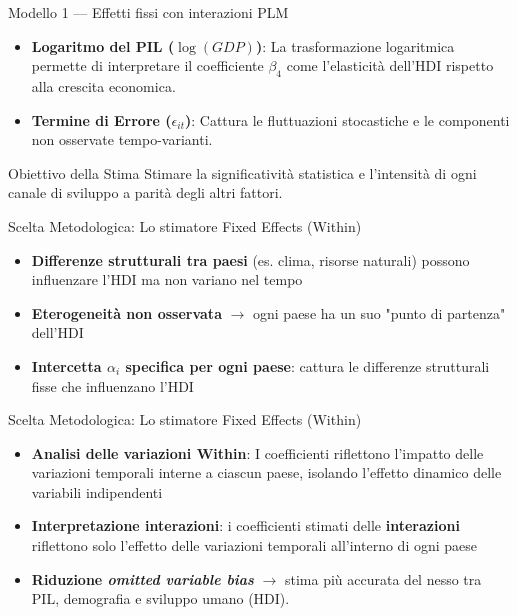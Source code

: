 \documentclass[
  ignorenonframetext,
  aspectratio=43,
]{beamer}
\begin{document}
\begin{frame}{Modello 1 --- Effetti fissi con interazioni PLM}
\label{modello-1-effetti-fissi-con-interazioni-plm}
\begin{itemize}
  \item \textbf{Logaritmo del PIL ($\log(GDP)$)}: La trasformazione logaritmica permette di interpretare il coefficiente $\beta_4$ come l'elasticità dell'HDI rispetto alla crescita economica.
  \item \textbf{Termine di Errore ($\epsilon_{it}$)}: Cattura le fluttuazioni stocastiche e le componenti non osservate tempo-varianti.
\end{itemize}

\vspace{0.5cm}

\begin{block}{Obiettivo della Stima}
Stimare la significatività statistica e l'intensità di ogni canale di sviluppo a parità degli altri fattori.
\end{block}
\end{frame}

\begin{frame}{Scelta Metodologica: Lo stimatore Fixed Effects (Within)}
\label{scelta-metodologica-lo-stimatore-fixed-effects-within}
\begin{itemize}
  \item \textbf{Differenze strutturali tra paesi} (es. clima, risorse naturali) possono influenzare l'HDI ma non variano nel tempo
  \item \textbf{Eterogeneità non osservata} $\rightarrow$ ogni paese ha un suo "punto di partenza" dell'HDI
  \item \textbf{Intercetta $\alpha_i$ specifica per ogni paese}: cattura le differenze strutturali fisse che influenzano l'HDI
\end{itemize}
\end{frame}

\begin{frame}{Scelta Metodologica: Lo stimatore Fixed Effects (Within)}
\label{scelta-metodologica-lo-stimatore-fixed-effects-within-1}
\begin{itemize}
  \item \textbf{Analisi delle variazioni Within}: I coefficienti riflettono l'impatto delle variazioni temporali interne a ciascun paese, isolando l'effetto dinamico delle variabili indipendenti
  \item \textbf{Interpretazione interazioni}: i coefficienti stimati delle \textbf{interazioni} riflettono solo l'effetto delle variazioni temporali all'interno di ogni paese
  \item \textbf{Riduzione \textit{omitted variable bias}} $\rightarrow$  stima più accurata del nesso tra PIL, demografia e sviluppo umano (HDI).
\end{itemize}
\end{frame}
\end{document}
